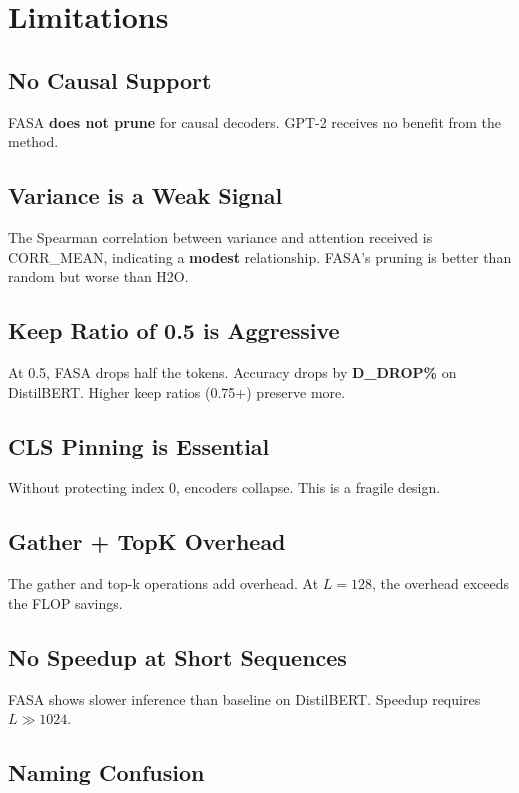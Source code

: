 
\section{Limitations}

\subsection{No Causal Support}

FASA \textbf{does not prune} for causal decoders. GPT-2 receives no benefit 
from the method.

\subsection{Variance is a Weak Signal}

The Spearman correlation between variance and attention received is 
{{CORR\_MEAN}}, indicating a \textbf{modest} relationship. FASA's pruning is 
better than random but worse than H2O.

\subsection{Keep Ratio of 0.5 is Aggressive}

At 0.5, FASA drops half the tokens. Accuracy drops by \textbf{{{D\_DROP}}\%} on 
DistilBERT. Higher keep ratios (0.75+) preserve more.

\subsection{CLS Pinning is Essential}

Without protecting index 0, encoders collapse. This is a fragile design.

\subsection{Gather + TopK Overhead}

The gather and top-k operations add overhead. At $L = 128$, the overhead 
exceeds the FLOP savings.

\subsection{No Speedup at Short Sequences}

FASA shows slower inference than baseline on DistilBERT. Speedup requires 
$L \gg 1024$.

\subsection{Naming Confusion}

